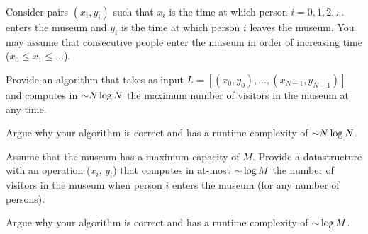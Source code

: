 \begin{problem}
Consider pairs $(x_i, y_i)$ such that $x_i$ is the time at which person $i = 0, 1, 2 , \dots$ enters the museum and $y_i$ is the time at which person $i$ leaves the museum.  You may assume that consecutive people enter the museum in order of increasing time ($x_0 \leq x_1 \leq \dots$).
\begin{questions}
\item Provide an algorithm  that takes as input $L = [(x_0, y_0), \dots, (x_{N-1}, y_{N-1})]$ and computes in $\mathord{\sim}N \log N$ the maximum number of visitors in the museum at any time.
\item Argue why your algorithm  is correct and has a runtime complexity of $\mathord{\sim}N \log N$.
\item Assume that the museum has a maximum capacity of $M$. Provide a datastructure with an operation ($x_i$, $y_i$) that computes in at-most $\mathord{\sim}\log M$ the number of visitors in the museum when person $i$ enters the museum (for any number of persons).
\item Argue why your algorithm  is correct and has a runtime complexity of $\mathord{\sim}\log M$.
\end{questions}

\end{problem}


\SUBMITMSG{}
\DEFAULTGRADING{}

